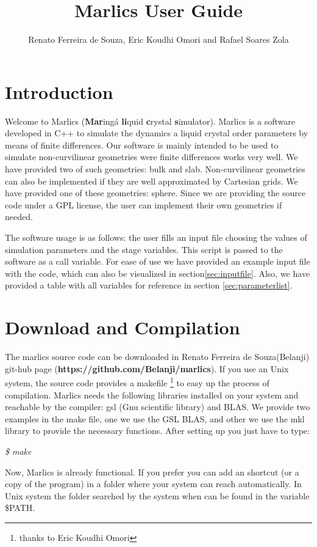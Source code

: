 \documentclass{article}
\title{Marlics User Guide}
\author{Renato Ferreira de Souza, Eric Koudhi Omori and Rafael Soares Zola}
\newcommand{\consoleline}[2][0.5cm]
{\vspace{#1}
\textit{{#2}}
\vspace{#1}
}
\begin{document}
\maketitle

\section{Introduction}
  
Welcome to Marlics (\textbf{Mar}ingá \textbf{li}quid \textbf{c}rystal
\textbf{s}imulator). Marlics is a software developed in C++ to
simulate the dynamics a liquid crystal order parameters by means of
finite differences. Our software is mainly intended to be used to
simulate non-curvilinear geometries were finite differences works very
well. We have provided two of such geometries: bulk and slab.
Non-curvilinear geometries can also be implemented if they are well
approximated by Cartesian grids. We have provided one of these
geometries: sphere.  Since we are providing the source code under a
GPL license, the user can implement their own geometries if needed.

The software usage is as follows: the user fills an input file choosing the
values of simulation parameters and the stage variables. This script
is passed to the software as a call variable. For ease of use we have
provided an example input file with the code, which can also be
visualized in section\ref{sec:inputfile}. Also, we have provided a
table with all variables for reference in section
\ref{sec:parameterlist}.


\section{Download and Compilation}

The marlics source code can be downloaded in Renato Ferreira de
Souza(Belanji) git-hub page
(\textbf{https://github.com/Belanji/marlics}). If you use an Unix
system, the source code provides a makefile \footnote{thanks to Eric
  Koudhi Omori} to easy up the process of compilation.  Marlics needs
the following libraries installed on your system and reachable by the
compiler: gsl (Gnu scientific library) and BLAS. We provide two
examples in the make file, one we use the GSL BLAS, and other we use
the mkl library to provide the necessary functions.  After setting up
you just have to type:

\consoleline{\$ make}

Now, Marlics is already functional. If you prefer you can add an
shortcut (or a copy of the program) in a folder where your system can
reach automatically. In Unix system the folder searched by the system
when can be found in the variable \$PATH.
\end{document}
